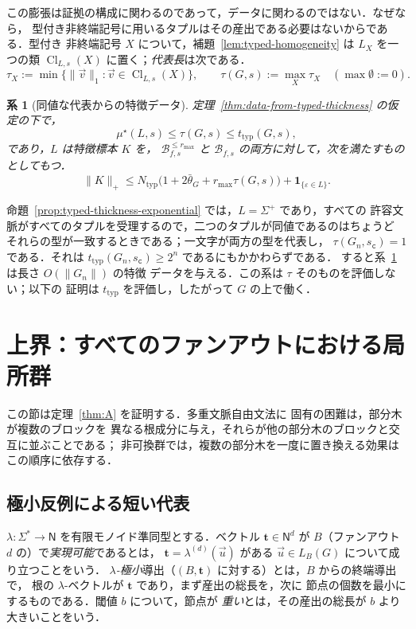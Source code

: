 \documentclass[11pt,a4paper]{ltjsarticle}
\numberwithin{equation}{section}
\theoremstyle{plain}
\newtheorem{corollary}[theorem]{系}
\theoremstyle{definition}
\theoremstyle{remark}
\newcommand{\tuple}[1]{\vec{#1}}
\newcommand{\eps}{\varepsilon}
\theoremstyle{plain}
\begin{document}
この膨張は証拠の構成に関わるのであって，データに関わるのではない．なぜなら，
型付き非終端記号に用いるタプルはその産出である必要はないからである．型付き
非終端記号 $X$ について，補題~\ref{lem:typed-homogeneity} は $L_X$ を一つの類
$\operatorname{Cl}_{L,s}(X)$ に置く；\emph{代表長}は次である．
\[
 \tau_X:=\min\{\|\tuple v\|_1:\tuple v\in\operatorname{Cl}_{L,s}(X)\},\qquad
 \tau(G,s):=\max_X\tau_X\quad(\max\emptyset:=0).
\]

\begin{corollary}[同値な代表からの特徴データ]
\label{cor:distribution-representatives}
定理~\ref{thm:data-from-typed-thickness} の仮定の下で，
\[
 \mu^\star(L,s)\le\tau(G,s)\le t_{\mathrm{typ}}(G,s),
\]
であり，$L$ は特徴標本 $K$ を，
$\mathcal B^{\le r_{\max}}_{f,s}$ と $\mathcal B_{f,s}$ の両方に対して，次を満たすものとしてもつ．
\[
 \|K\|_+\le N_{\mathrm{typ}}\bigl(1+2\bar\theta_G+r_{\max}\tau(G,s)\bigr)
 +\mathbf 1_{\{\eps\in L\}}.
\]
\end{corollary}


命題~\ref{prop:typed-thickness-exponential} では，$L=\Sigma^+$ であり，すべての
許容文脈がすべてのタプルを受理するので，二つのタプルが同値であるのはちょうど
それらの型が一致するときである；一文字が両方の型を代表し，
$\tau(G_n,s_{\mathtt c})=1$ である．それは $t_{\mathrm{typ}}(G_n,s_{\mathtt c})\ge2^n$ であるにもかかわらずである．
すると系~\ref{cor:distribution-representatives} は長さ $O(\|G_n\|)$ の特徴
データを与える．この系は $\tau$ そのものを評価しない；以下の
証明は $t_{\mathrm{typ}}$ を評価し，したがって $G$ の上で働く．

\section{上界：すべてのファンアウトにおける局所群}
\label{sec:upper}

この節は定理~\ref{thm:A} を証明する．多重文脈自由文法に
固有の困難は，部分木が複数のブロックを
異なる根成分に与え，それらが他の部分木のブロックと交互に並ぶことである；
非可換群では，複数の部分木を一度に置き換える効果は
この順序に依存する．

\subsection{極小反例による短い代表}
\label{subsec:group-invariants}

$\lambda:\Sigma^*\to\mathsf N$ を有限モノイド準同型とする．ベクトル
$\mathbf t\in\mathsf N^d$ が $B$（ファンアウト $d$ の）で\emph{実現可能}であるとは，
$\mathbf t=\lambda^{(d)}(\tuple u)$ がある $\tuple u\in L_B(G)$ について成り立つことをいう．
\emph{$\lambda$-極小}導出（$(B,\mathbf t)$ に対する）とは，$B$ からの終端導出で，
根の $\lambda$-ベクトルが $\mathbf t$ であり，まず産出の総長を，次に
節点の個数を最小にするものである．閾値 $b$ について，節点が
\emph{重い}とは，その産出の総長が $b$ より大きいことをいう．
\end{document}

